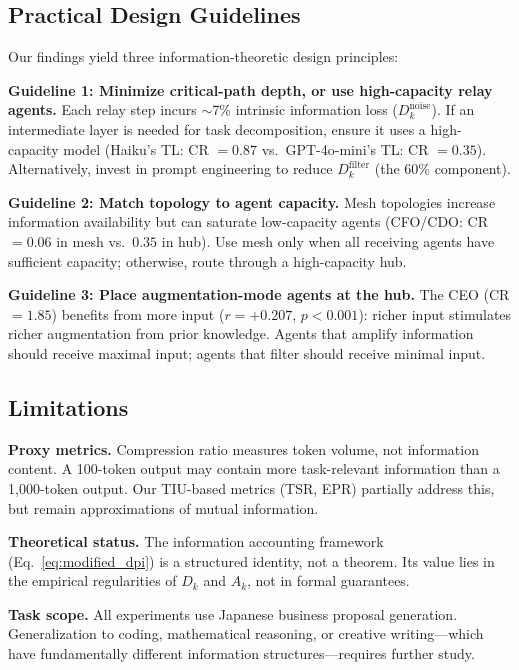 \documentclass[conference]{IEEEtran}
\begin{document}
\subsection{Practical Design Guidelines}

Our findings yield three information-theoretic design principles:

\textbf{Guideline 1: Minimize critical-path depth, or use high-capacity relay agents.}
Each relay step incurs $\sim$7\% intrinsic information loss ($D_k^{\text{noise}}$).
If an intermediate layer is needed for task decomposition, ensure it uses a high-capacity model (Haiku's TL: CR $= 0.87$ vs.\ GPT-4o-mini's TL: CR $= 0.35$).
Alternatively, invest in prompt engineering to reduce $D_k^{\text{filter}}$ (the 60\% component).

\textbf{Guideline 2: Match topology to agent capacity.}
Mesh topologies increase information availability but can saturate low-capacity agents (CFO/CDO: CR $= 0.06$ in mesh vs.\ $0.35$ in hub).
Use mesh only when all receiving agents have sufficient capacity; otherwise, route through a high-capacity hub.

\textbf{Guideline 3: Place augmentation-mode agents at the hub.}
The CEO (CR $= 1.85$) benefits from more input ($r = +0.207$, $p < 0.001$): richer input stimulates richer augmentation from prior knowledge.
Agents that amplify information should receive maximal input; agents that filter should receive minimal input.

\subsection{Limitations}

\textbf{Proxy metrics.}
Compression ratio measures token volume, not information content.
A 100-token output may contain more task-relevant information than a 1,000-token output.
Our TIU-based metrics (TSR, EPR) partially address this, but remain approximations of mutual information.

\textbf{Theoretical status.}
The information accounting framework (Eq.~\ref{eq:modified_dpi}) is a structured identity, not a theorem.
Its value lies in the empirical regularities of $D_k$ and $A_k$, not in formal guarantees.

\textbf{Task scope.}
All experiments use Japanese business proposal generation.
Generalization to coding, mathematical reasoning, or creative writing---which have fundamentally different information structures---requires further study.
\end{document}
